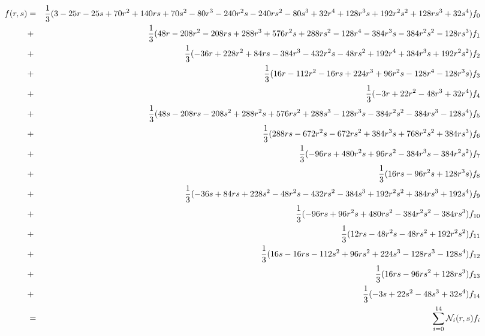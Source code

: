 \begin{scriptsize}
\begin{eqnarray}
f(r,s) 
&=&\frac13 ( 3-25r-25s+70r^2+140rs+70s^2 -80r^3-240r^2s-240rs^2-80s^3+32r^4 + 128 r^3s + 192 r^2s^2 + 128 rs^3 + 32 s^4 )f_0 \nonumber\\
&+&\frac13 ( 48r -208r^2-208rs +288r^3+576r^2s+288rs^2-128r^4-384r^3s-384r^2s^2-128rs^3)f_1 \nonumber\\
&+&\frac13 ( -36r +228r^2+84rs -384r^3-432r^2s-48rs^2+192r^4+384r^3s+192r^2s^2)f_2 \nonumber\\
&+&\frac13 ( 16r -112r^2-16rs +224r^3+96r^2s-128r^4-128r^3s)f_3 \nonumber\\
&+&\frac13 ( -3r +22r^2 -48r^3+32r^4)f_4 \nonumber\\
&+&\frac13 ( 48s -208rs-208s^2 +288r^2s+576rs^2+288s^3-128r^3s-384r^2s^2-384rs^3-128s^4)f_5 \nonumber\\
&+&\frac13 ( 288rs -672r^2s-672rs^2+384r^3s+768r^2s^2+384rs^3 )f_6 \nonumber\\
&+&\frac13 ( -96rs +480r^2s+96rs^2-384r^3s-384r^2s^2)f_7 \nonumber\\
&+&\frac13 ( 16rs -96r^2s+128r^3s   )f_8 \nonumber\\
&+&\frac13 ( -36s+84rs+228s^2 -48r^2s-432rs^2-384s^3 +192r^2s^2+384rs^3+192s^4)f_9 \nonumber\\
&+&\frac13 ( -96rs+96r^2s+480rs^2-384r^2s^2-384rs^3 )f_{10} \nonumber\\
&+&\frac13 ( 12rs-48r^2s-48rs^2+192r^2s^2 )f_{11} \nonumber\\
&+&\frac13 ( 16s-16rs-112s^2+96rs^2+224s^3-128rs^3-128s^4 )f_{12} \nonumber\\
&+&\frac13 ( 16rs-96rs^2+128rs^3 )f_{13} \nonumber\\
&+&\frac13 (-3s+22s^2-48s^3+32s^4  )f_{14} \nonumber\\
&=& \sum_{i=0}^{14} {\mathcal{N}}_i(r,s) f_i
\end{eqnarray}
\end{scriptsize}




